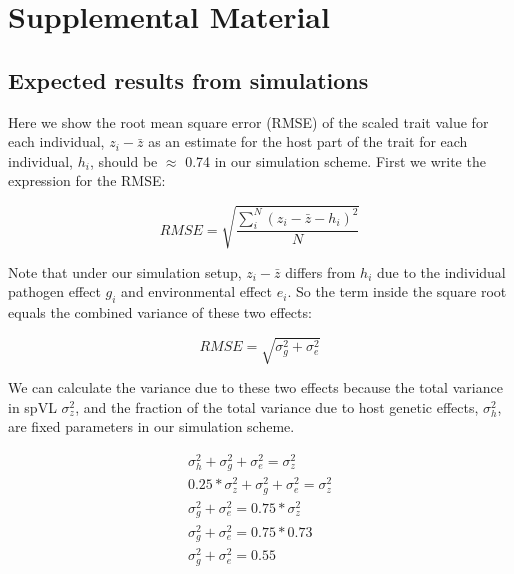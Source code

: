 \documentclass[11pt]{article}
\newcommand{\beginsupplement}{\setcounter{figure}{0}
        \renewcommand{\thefigure}{S\arabic{figure}}
        \setcounter{table}{0}
        \renewcommand{\thetable}{S\arabic{table}}}
\begin{document}
\newpage
\startsetups
    \setcounter{figure}{0}
    \renewcommand{\thefigure}{S\arabic{figure}}
    \setcounter{table}{0}
    \renewcommand{\thetable}{S\arabic{table}}
\stopsetups
\section*{Supplemental Material}\label{supp}
\beginsupplement
\setcounter{page}{1}

\begin{doublespace}

\subsection*{Expected results from simulations}

Here we show the root mean square error (RMSE) of the scaled trait value for each individual, $z_i - \bar{z}$ as an estimate for the host part of the trait for each individual, ${h_i}$, should be $\approx$ 0.74 in our simulation scheme. First we write the expression for the RMSE:

\begin{equation}
    RMSE = \sqrt{\frac{\sum_i^N(z_i - \bar{z} - h_i)^2}{N}}
\end{equation}

Note that under our simulation setup, $z_i - \bar{z}$ differs from $h_i$ due to the individual pathogen effect $g_i$ and environmental effect $e_i$. So the term inside the square root equals the combined variance of these two effects:

\begin{equation}
    RMSE = \sqrt{\sigma^2_{g} + \sigma^2_e}
\end{equation}

We can calculate the variance due to these two effects because the total variance in spVL $\sigma^2_z$, and the fraction of the total variance due to host genetic effects, $\sigma^2_{h}$, are fixed parameters in our simulation scheme.

\begin{equation}
\begin{split}
    \sigma^2_{h} + \sigma^2_{g} + \sigma^2_e = \sigma^2_z \\
    0.25 * \sigma^2_{z} + \sigma^2_{g} + \sigma^2_e = \sigma^2_z \\
    \sigma^2_{g} + \sigma^2_e = 0.75 * \sigma^2_z \\
    \sigma^2_{g} + \sigma^2_e = 0.75 * 0.73 \\
    \sigma^2_{g} + \sigma^2_e = 0.55
\end{split}
\end{equation}


\end{doublespace}
\end{document}
